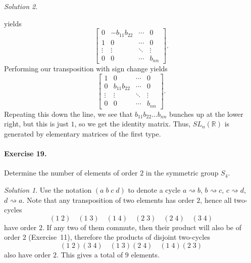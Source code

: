 \documentclass[11pt]{report}
\def\R{\mathbb{R}}
\theoremstyle{remark}
\newtheorem*{solution}{Solution}
\begin{document}
\begin{solution}
\begin{enumerate}
        yields \[
            \begin{bmatrix}
                0 & -b_{11}b_{22} & \cdots & 0\\
                1 & 0 & \cdots & 0\\
                \vdots & \vdots & \ddots & \vdots \\
                0 & 0 & \cdots & b_{nn}
            \end{bmatrix}.
        \] Performing our transposition with sign change yields \[
            \begin{bmatrix}
                1 & 0 & \cdots & 0\\
                0 & b_{11}b_{22} & \cdots & 0\\
                \vdots & \vdots & \ddots & \vdots \\
                0 & 0 & \cdots & b_{nn}
            \end{bmatrix}.
        \] Repeating this down the line, we see that $b_{11}b_{22} \dots b_{nn}$
        bunches up at the lower right, but this is just $1$, so we get the identity
        matrix. Thus, $SL_{n}(\R)$ is generated by elementary matrices of the first
        type.
    \end{enumerate}

    \paragraph{Exercise 19.} Determine the number of elements of order $2$ in the
    symmetric group $S_4$.
    \begin{solution}
        Use the notation $(a\; b\; c\; d)$ to denote a cycle $a\rightsquigarrow b$,
        $b \rightsquigarrow c$, $c \rightsquigarrow d$, $d \rightsquigarrow a$.
        Note that any transposition of two elements has order $2$, hence all
        two-cycles \[
            (1\;2)\quad (1\;3)\quad (1\;4)\quad (2\;3)\quad (2\;4)\quad (3\;4)
        \] have order $2$. If any two of them commute, then their product will also
        be of order $2$ (Exercise~11), therefore the products of disjoint two-cycles
        \[
            (1\;2)(3\;4)\quad (1\;3)(2\;4)\quad (1\;4)(2\;3)
        \] also have order $2$. This gives a total of $9$ elements.
    \end{solution}


\end{solution}
\end{document}
